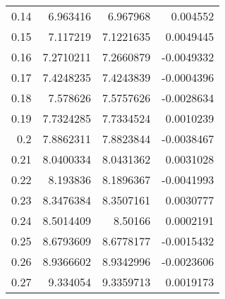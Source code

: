 \begin{table}
\begin{latin}
\begin{tabular}{rrrr}
			0.14                     & 6.963416                                   & 6.967968                                      & 0.004552                  \\
			0.15                     & 7.117219                                   & 7.1221635                                     & 0.0049445                 \\
			0.16                     & 7.2710211                                  & 7.2660879                                     & -0.0049332                \\
			0.17                     & 7.4248235                                  & 7.4243839                                     & -0.0004396                \\
			0.18                     & 7.578626                                   & 7.5757626                                     & -0.0028634                \\
			0.19                     & 7.7324285                                  & 7.7334524                                     & 0.0010239                 \\
			0.2                      & 7.8862311                                  & 7.8823844                                     & -0.0038467                \\
			0.21                     & 8.0400334                                  & 8.0431362                                     & 0.0031028                 \\
			0.22                     & 8.193836                                   & 8.1896367                                     & -0.0041993                \\
			0.23                     & 8.3476384                                  & 8.3507161                                     & 0.0030777                 \\
			0.24                     & 8.5014409                                  & 8.50166                                       & 0.0002191                 \\
			0.25                     & 8.6793609                                  & 8.6778177                                     & -0.0015432                \\
			0.26                     & 8.9366602                                  & 8.9342996                                     & -0.0023606                \\
			0.27                     & 9.334054                                   & 9.3359713                                     & 0.0019173                 \\

\end{tabular}
\end{latin}
\end{table}
